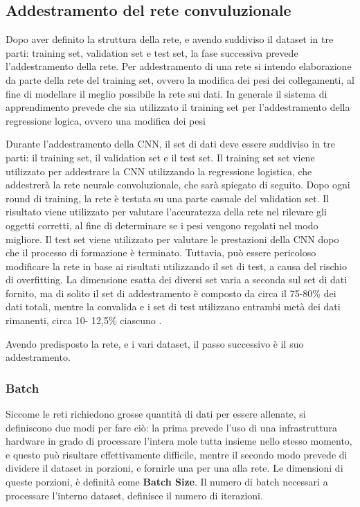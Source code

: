 \documentclass[14pt]{extarticle}
\begin{document}
\subsection{Addestramento del rete convuluzionale}
Dopo aver definito la struttura della rete, e avendo suddiviso il dataset in tre parti: training set, validation set e test set, la fase successiva prevede l'addestramento della rete.
Per addestramento di una rete si intendo elaborazione da parte della  rete del training set, ovvero la modifica dei pesi dei collegamenti, al fine di modellare il meglio possibile la rete sui dati. 
In generale il sistema di apprendimento prevede che sia utilizzato il training set per l'addestramento della regressione logica, ovvero una modifica dei pesi 

Durante l'addestramento della CNN, il set di dati deve essere suddiviso in tre parti:
il training set, il validation set e il test set. Il training set
set viene utilizzato per addestrare la CNN utilizzando la regressione logistica, che addestrerà la rete neurale convoluzionale, che sarà spiegato di seguito. Dopo ogni round di training, la rete è
testata su una parte casuale del validation set. Il risultato viene utilizzato per valutare l'accuratezza della rete nel rilevare gli oggetti corretti,
al fine di determinare se i pesi vengono regolati nel modo migliore.
Il test set viene utilizzato per valutare le prestazioni della CNN dopo che
il processo di formazione è terminato. Tuttavia, può essere pericoloso modificare
la rete in base ai risultati utilizzando il set di test, a causa del rischio
di overfitting. La dimensione esatta dei diversi set varia a seconda
sul set di dati fornito, ma di solito il set di addestramento è composto da
circa il 75-80\% dei dati totali, mentre la convalida e
i set di test utilizzano entrambi metà dei dati rimanenti, circa 10-
12,5\% ciascuno \cite{guyon1997scaling}.

Avendo predisposto la rete, e i vari dataset, il passo successivo è il suo addestramento.

\subsubsection{Batch}
Siccome le reti richiedono grosse quantità di dati per essere allenate, si definiscono due modi per fare ciò: la prima prevede l'uso di una infrastruttura hardware in grado di processare l'intera mole tutta insieme nello stesso momento, e questo può risultare effettivamente difficile, mentre il secondo modo prevede di dividere il dataset in porzioni, e fornirle una per una alla rete.
Le dimensioni di queste porzioni, è definità come \textbf{Batch Size}.
Il numero di batch  necessari a processare l'interno dataset, definisce il numero di iterazioni.
\end{document}
